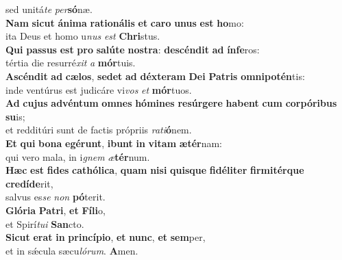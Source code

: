 \evenverse sed unitá\textit{te} \textit{per}\textbf{só}næ.\\
\oddverse \textbf{Nam} \textbf{si}\textbf{cut} \textbf{á}\textbf{ni}\textbf{ma} \textbf{ra}\textbf{ti}\textbf{o}\textbf{ná}\textbf{lis} \textbf{et} \textbf{ca}\textbf{ro} \textbf{u}\textbf{nus} \textbf{est} \textbf{ho}mo:~\*\\
\oddverse ita Deus et homo u\textit{nus} \textit{est} \textbf{Chri}stus.\\
\evenverse \textbf{Qui} \textbf{pas}\textbf{sus} \textbf{est} \textbf{pro} \textbf{sa}\textbf{lú}\textbf{te} \textbf{no}\textbf{stra}: \textbf{de}\textbf{scén}\textbf{dit} \textbf{ad} \textbf{ín}\textbf{fe}ros:~\*\\
\evenverse tértia die resurré\textit{xit} \textit{a} \textbf{mór}tuis.\\
\oddverse \textbf{A}\textbf{scén}\textbf{dit} \textbf{ad} \textbf{cæ}\textbf{los}, \textbf{se}\textbf{det} \textbf{ad} \textbf{déx}\textbf{te}\textbf{ram} \textbf{De}\textbf{i} \textbf{Pa}\textbf{tris} \textbf{om}\textbf{ni}\textbf{po}\textbf{tén}tis:~\*\\
\oddverse inde ventúrus est judicáre vi\textit{vos} \textit{et} \textbf{mór}tuos.\\
\evenverse \textbf{Ad} \textbf{cu}\textbf{jus} \textbf{ad}\textbf{vén}\textbf{tum} \textbf{om}\textbf{nes} \textbf{hó}\textbf{mi}\textbf{nes} \textbf{re}\textbf{súr}\textbf{ge}\textbf{re} \textbf{ha}\textbf{bent} \textbf{cum} \textbf{cor}\textbf{pó}\textbf{ri}\textbf{bus} \textbf{su}is;~\*\\
\evenverse et redditúri sunt de factis própriis \textit{ra}\textit{ti}\textbf{ó}nem.\\
\oddverse \textbf{Et} \textbf{qui} \textbf{bo}\textbf{na} \textbf{e}\textbf{gé}\textbf{runt}, \textbf{i}\textbf{bunt} \textbf{in} \textbf{vi}\textbf{tam} \textbf{æ}\textbf{tér}nam:~\*\\
\oddverse qui vero mala, in i\textit{gnem} \textit{æ}\textbf{tér}num.\\
\evenverse \textbf{Hæc} \textbf{est} \textbf{fi}\textbf{des} \textbf{ca}\textbf{thó}\textbf{li}\textbf{ca}, \textbf{quam} \textbf{ni}\textbf{si} \textbf{quis}\textbf{que} \textbf{fi}\textbf{dé}\textbf{li}\textbf{ter} \textbf{fir}\textbf{mi}\textbf{tér}\textbf{que} \textbf{cre}\textbf{dí}\textbf{de}rit,~\*\\
\evenverse salvus es\textit{se} \textit{non} \textbf{pó}terit.\\
\oddverse \textbf{Gló}\textbf{ri}\textbf{a} \textbf{Pa}\textbf{tri}, \textbf{et} \textbf{Fí}\textbf{li}o,~\*\\
\oddverse et Spirí\textit{tu}\textit{i} \textbf{San}cto.\\
\evenverse \textbf{Si}\textbf{cut} \textbf{e}\textbf{rat} \textbf{in} \textbf{prin}\textbf{cí}\textbf{pi}\textbf{o}, \textbf{et} \textbf{nunc}, \textbf{et} \textbf{sem}per,~\*\\
\evenverse et in sǽcula sæcu\textit{ló}\textit{rum}. \textbf{A}men.\\
